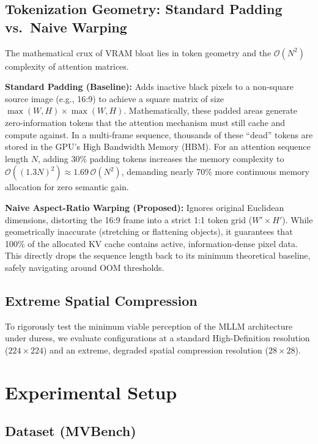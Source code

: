 \documentclass[conference]{IEEEtran}
\newcommand{\bigO}[1]{\mathcal{O}\!\left(#1\right)}
\begin{document}
\subsection{Tokenization Geometry: Standard Padding vs.\ Naive Warping}

The mathematical crux of VRAM bloat lies in token geometry and the
$\bigO{N^2}$ complexity of attention matrices.

\textbf{Standard Padding (Baseline):} Adds inactive black pixels to a
non-square source image (e.g., 16:9) to achieve a square matrix of size
$\max(W,H) \times \max(W,H)$. Mathematically, these padded areas
generate zero-information tokens that the attention mechanism must still
cache and compute against. In a multi-frame sequence, thousands of these
``dead'' tokens are stored in the GPU's High Bandwidth Memory (HBM). For
an attention sequence length $N$, adding 30\% padding tokens increases
the memory complexity to $\bigO{(1.3N)^2} \approx 1.69\,\bigO{N^2}$,
demanding nearly 70\% more continuous memory allocation for zero semantic
gain.

\textbf{Naive Aspect-Ratio Warping (Proposed):} Ignores original
Euclidean dimensions, distorting the 16:9 frame into a strict 1:1 token
grid ($W' \times H'$). While geometrically inaccurate (stretching or
flattening objects), it guarantees that 100\% of the allocated KV cache
contains active, information-dense pixel data. This directly drops the
sequence length back to its minimum theoretical baseline, safely
navigating around OOM thresholds.

\subsection{Extreme Spatial Compression}

To rigorously test the minimum viable perception of the MLLM architecture
under duress, we evaluate configurations at a standard High-Definition
resolution ($224{\times}224$) and an extreme, degraded spatial compression
resolution ($28{\times}28$).

\section{Experimental Setup}
\label{sec:setup}

\subsection{Dataset (MVBench)}
\end{document}
